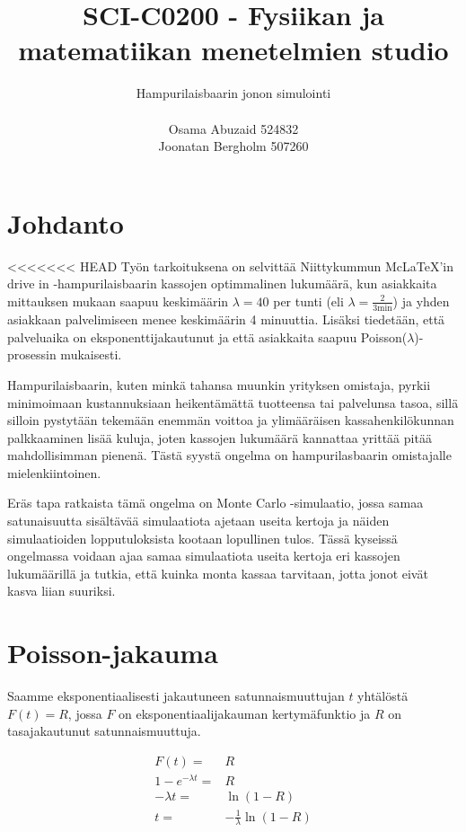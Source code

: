 \documentclass{article}     %
\title{SCI-C0200 - Fysiikan ja matematiikan menetelmien studio}
\author{Hampurilaisbaarin jonon simulointi\\ \\ Osama Abuzaid 524832 \\ Joonatan Bergholm 507260}
\begin{document}
\maketitle
\newpage

\pagestyle{fancy}
\lstset{language = Matlab}

\section*{Johdanto}

<<<<<<< HEAD
Työn tarkoituksena on selvittää Niittykummun Mc\LaTeX'in drive in -hampurilaisbaarin kassojen optimmalinen lukumäärä, kun asiakkaita mittauksen mukaan saapuu keskimäärin $\lambda = 40$ per tunti (eli $\lambda = \frac{2}{3 \mathrm{min}}$) ja yhden asiakkaan palvelimiseen menee keskimäärin 4 minuuttia. Lisäksi tiedetään, että palveluaika on eksponenttijakautunut ja että asiakkaita saapuu Poisson($\lambda$)-prosessin mukaisesti. \par
Hampurilaisbaarin, kuten minkä tahansa muunkin yrityksen omistaja, pyrkii minimoimaan kustannuksiaan heikentämättä tuotteensa tai palvelunsa tasoa, sillä silloin pystytään tekemään enemmän voittoa ja ylimääräisen kassahenkilökunnan palkkaaminen lisää kuluja, joten kassojen lukumäärä kannattaa yrittää pitää mahdollisimman pienenä. Tästä syystä ongelma on hampurilasbaarin omistajalle mielenkiintoinen. \par
Eräs tapa ratkaista tämä ongelma on Monte Carlo -simulaatio, jossa samaa satunaisuutta sisältävää simulaatiota ajetaan useita kertoja ja näiden simulaatioiden lopputuloksista kootaan lopullinen tulos. Tässä kyseissä ongelmassa voidaan ajaa samaa simulaatiota useita kertoja eri kassojen lukumäärillä ja tutkia, että kuinka monta kassaa tarvitaan, jotta jonot eivät kasva liian suuriksi.


\section*{Poisson-jakauma}

Saamme eksponentiaalisesti jakautuneen satunnaismuuttujan $t$ yhtälöstä $F(t) = R$, jossa $F$ on eksponentiaalijakauman kertymäfunktio ja $R$ on tasajakautunut satunnaismuuttuja.

\begin{align*}
F(t) =& R \\
1-e^{-\lambda t} =& R \\
-\lambda t =& \ln (1 - R) \\
t =& -\frac{1}{\lambda} \ln (1 - R)
\end{align*}
\end{document}
